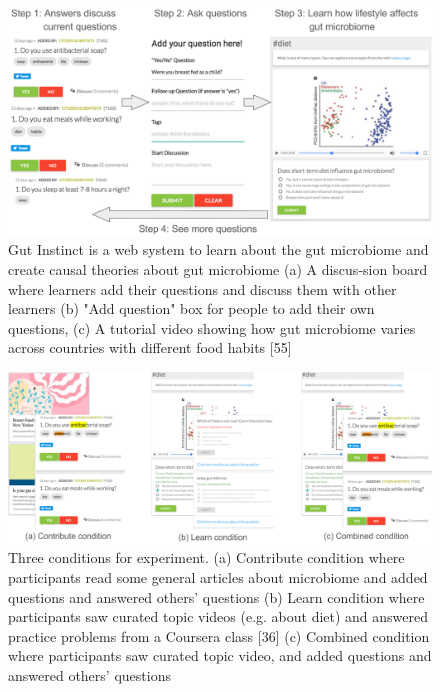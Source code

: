 \begin{figure}[h] 
  \centering
  \includegraphics[width=1.0\textwidth]{figures/gutinstinct/gi-5.png}
  \caption[]
{ Gut Instinct is a web system to learn about the gut microbiome and create causal theories about gut microbiome (a) A discus-sion board where learners add their questions and discuss them with other learners (b) "Add question" box for people to add their own questions, (c) A tutorial video showing how gut microbiome varies across countries with different food habits [55]}
  \label{fig:gi-5}
\end{figure}

\begin{figure}[h] 
  \centering
  \includegraphics[width=1.0\textwidth]{figures/gutinstinct/gi-6.png}
  \caption[]
{Three conditions for experiment. (a) Contribute condition where participants read some general articles about microbiome and added questions and answered others’ questions (b) Learn condition where participants saw curated topic videos (e.g. about diet) and answered practice problems from a Coursera class [36] (c) Combined condition where participants saw curated topic video, and added questions and answered others’ questions }
  \label{fig:gi-6}
\end{figure}


